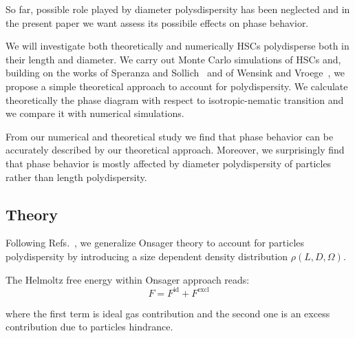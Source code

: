 \documentclass[journal=jacsat,manuscript=article]{achemso}
\begin{document}
So far, possible role played by diameter polysdispersity has been neglected and in the present 
paper we want assess its possibile effects on phase behavior.

We will investigate both theoretically and numerically HSCs polydisperse both in their length and diameter.
We carry out Monte Carlo simulations of HSCs and, building on the works of Speranza and Sollich~\cite{Speranza2002}
and of Wensink and Vroege~\cite{Wensink2003}, we propose a simple theoretical approach to account for polydispersity. 
We calculate theoretically the phase diagram with respect to isotropic-nematic transition and we compare it with numerical simulations.

From our numerical and theoretical study we find that phase behavior can be accurately described by our theoretical approach.
Moreover, we surprisingly find that phase behavior is mostly affected by diameter polydispersity of particles
rather than length polydispersity. 


\subsection{Theory} \label{sec:Theory}

Following Refs.~\cite{Speranza2002,Wensink2003}, we generalize Onsager theory to account for particles polydispersity by introducing a 
size dependent density distribution $\rho(L,D,\Omega)$.

The Helmoltz free energy within Onsager approach reads:
\begin{equation}
	F = F^\mathrm{id} + F^\mathrm{excl}
\end{equation}

where the first term is ideal gas contribution and the second one is an excess contribution due to particles hindrance.


\end{document}
